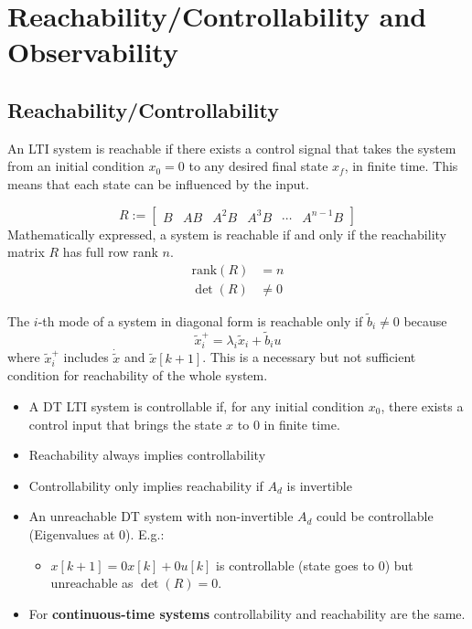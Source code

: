 \section{Reachability/Controllability and Observability}

\subsection{Reachability/Controllability}

An LTI system is reachable if there exists a control signal that takes the system from an initial condition $x_0 = 0$ to any desired final state $x_f$, in finite time. This means that each state can be influenced by the input.

\begin{equation*}
    R:= \begin{bmatrix}
        B & AB & A^2B & A^3B & \cdots & A^{n-1}B
    \end{bmatrix}
\end{equation*}
Mathematically expressed, a system is reachable if and only if the reachability matrix $R$ has full row rank $n$.
\begin{align*}
    \text{rank}(R) & = n    \\
    \det(R)        & \neq 0
\end{align*}


The $i$-th mode of a system in diagonal form is reachable only if $\tilde{b}_i \neq 0$ because
\begin{equation*}
    \tilde{x}_i^+ =\lambda_i\tilde{x}_i+\tilde{b}_i u
\end{equation*}
where $\tilde{x}_i^+$ includes $\dot{\tilde{x}}$ and $\tilde{x}[k+1]$. This is a necessary but not sufficient condition for reachability of the whole system.


\begin{itemize}
    \item A DT LTI system is controllable if, for any initial condition $x_0$, there exists a control input that brings the state $x$ to $0$ in finite time.
    \item Reachability always implies controllability
    \item Controllability only implies reachability if $A_d$ is invertible
    \item An unreachable DT system with non-invertible $A_d$ could be controllable (Eigenvalues at 0). E.g.:
          \begin{itemize}
              \item $x[k+1] = 0x[k] + 0u[k]$ is controllable (state goes to $0$) but unreachable as $\det(R)=0$.
          \end{itemize}
    \item For \textbf{continuous-time systems} controllability and reachability are the same.
\end{itemize}

